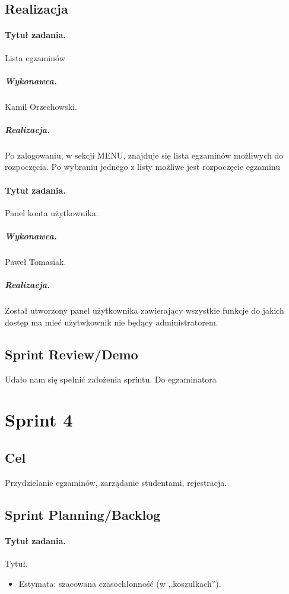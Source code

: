 \documentclass[a4paper]{article}
\begin{document}
\subsection{Realizacja}

\paragraph{Tytuł zadania.}  Lista egzaminów
\subparagraph{Wykonawca.} Kamil Orzechowski.
\subparagraph{Realizacja.} Po zalogowaniu, w sekcji MENU, znajduje się lista egzaminów możliwych do rozpoczęcia. Po wybraniu jednego z listy możliwe jest rozpoczęcie egzaminu

\paragraph{Tytuł zadania.} Panel konta użytkownika.
\subparagraph{Wykonawca.} Paweł Tomasiak.
\subparagraph{Realizacja.} Został utworzony panel użytkownika zawierający wszystkie funkcje do jakich dostęp ma mieć użytwkownik nie będący administratorem. 
 
\subsection{Sprint Review/Demo}
Udało nam się spełnić założenia sprintu. Do egzaminatora

\section{Sprint 4}

\subsection{Cel} Przydzielanie egzaminów, zarządanie studentami, rejestracja. 

\subsection{Sprint Planning/Backlog}

\paragraph{Tytuł zadania.} Tytuł.
\begin{itemize}
\item Estymata: szacowana czasochłonność (w ,,koszulkach'').
\end{itemize}
\end{document}

